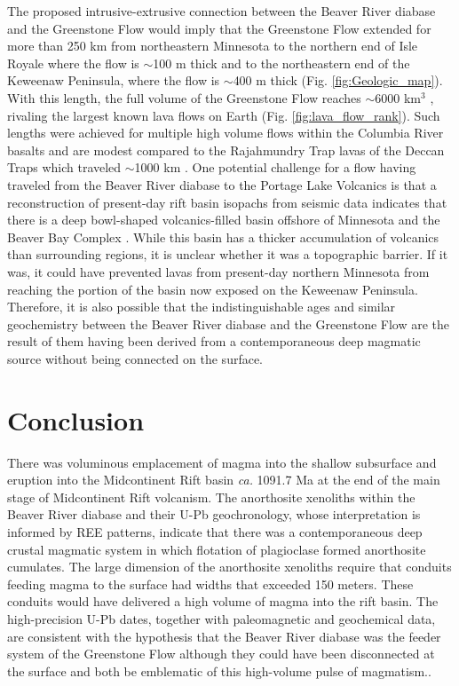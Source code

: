 The proposed intrusive-extrusive connection between the Beaver River diabase and the Greenstone Flow would imply that the Greenstone Flow extended for more than 250 km from northeastern Minnesota to the northern end of Isle Royale where the flow is $\sim$100 m thick and to the northeastern end of the Keweenaw Peninsula, where the flow is $\sim$400 m thick (Fig. \ref{fig:Geologic_map}). With this length, the full volume of the Greenstone Flow reaches $\sim$6000 km$^3$ \cite{Doyle2016a}, rivaling the largest known lava flows on Earth (Fig. \ref{fig:lava_flow_rank}). Such lengths were achieved for multiple high volume flows within the Columbia River basalts \cite{Reidel2013a} and are modest compared to the Rajahmundry Trap lavas of the Deccan Traps which traveled $\sim$1000 km \cite{Self2008a}. One potential challenge for a flow having traveled from the Beaver River diabase to the Portage Lake Volcanics is that a reconstruction of present-day rift basin isopachs from seismic data indicates that there is a deep bowl-shaped volcanics-filled basin offshore of Minnesota and the Beaver Bay Complex \cite{Stewart2018a}. While this basin has a thicker accumulation of volcanics than surrounding regions, it is unclear whether it was a topographic barrier. If it was, it could have prevented lavas from present-day northern Minnesota from reaching the portion of the basin now exposed on the Keweenaw Peninsula. Therefore, it is also possible that the indistinguishable ages and similar geochemistry between the Beaver River diabase and the Greenstone Flow are the result of them having been derived from a contemporaneous deep magmatic source without being connected on the surface. 

\section{Conclusion}

There was voluminous emplacement of magma into the shallow subsurface and eruption into the Midcontinent Rift basin \textit{ca.} 1091.7 Ma at the end of the main stage of Midcontinent Rift volcanism. The anorthosite xenoliths within the Beaver River diabase and their U-Pb geochronology, whose interpretation is informed by REE patterns, indicate that there was a contemporaneous deep crustal magmatic system in which flotation of plagioclase formed anorthosite cumulates. The large dimension of the anorthosite xenoliths require that conduits feeding magma to the surface had widths that exceeded 150 meters. These conduits would have delivered a high volume of magma into the rift basin. The high-precision U-Pb dates, together with paleomagnetic and geochemical data, are consistent with the hypothesis that the Beaver River diabase was the  feeder system of the Greenstone Flow although they could have been disconnected at the surface and both be emblematic of this high-volume pulse of magmatism..


